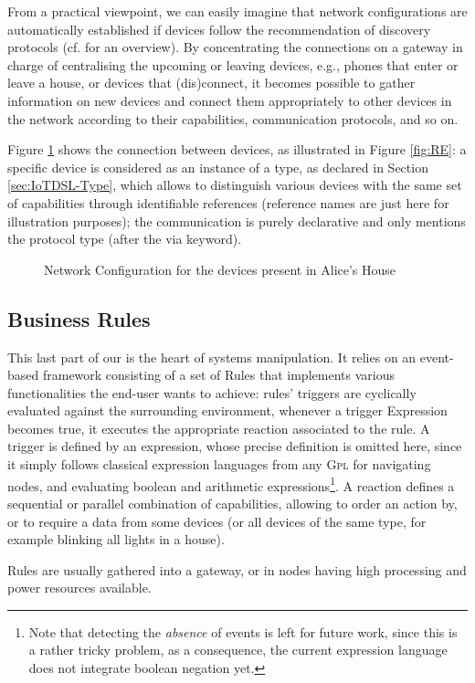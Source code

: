 From a practical viewpoint, we can easily imagine that network configurations are automatically established if devices follow the recommendation of discovery protocols (cf. \cite{} for an overview). By concentrating the connections on a gateway in charge of centralising the upcoming or leaving devices, e.g., phones that enter or leave a house, or devices that (dis)connect, it becomes possible to gather information on new devices and connect them appropriately to other devices in the network according to their capabilities, communication protocols, and so on.

Figure \ref{fig:RE-Network} shows the connection between devices, as illustrated in Figure \ref{fig:RE}: a specific device is considered as an instance of a type, as declared in Section \ref{sec:IoTDSL-Type}, which allows to distinguish various devices with the same set of capabilities through identifiable references (reference names are just here for illustration purposes); the communication is purely declarative and only mentions the protocol type (after the \textsf{via} keyword).

\begin{figure}[t]%
\caption{Network Configuration for the devices present in Alice's House}%
\label{fig:RE-Network}%
\end{figure}	
	
\subsection{Business Rules}
\label{sec:IoTDSL-BusinessRules}

This last part of our \DSL is the heart of \IOT systems manipulation. It relies on an event-based framework consisting of a set of \textsf{Rule}s that implements various functionalities the end-user wants to achieve: rules' \textsf{trigger}s are cyclically evaluated against the surrounding environment, whenever a \textsf{trigger} \textsf{Expression} becomes true, it executes the appropriate \textsf{reaction} associated to the rule. A \textsf{trigger} is defined by an expression, whose precise definition is omitted here, since it simply follows classical expression languages from any \textsc{Gpl} for navigating nodes, and evaluating boolean and arithmetic expressions\footnote{Note that detecting the \emph{absence} of events is left for future work, since this is a rather tricky problem, as a consequence, the current expression language does not integrate boolean negation yet.}. A \textsf{reaction} defines a sequential or parallel combination of capabilities, allowing to order an action by, or to require a data from some devices (or all devices of the same type, for example blinking all lights in a house).
	
Rules are usually gathered into a gateway, or in nodes having high processing and power resources available.

